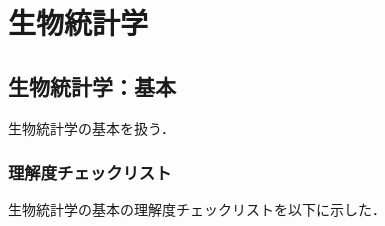 
\part{生物統計学}

\chapter{生物統計学：基本}

生物統計学の基本を扱う．

\section{理解度チェックリスト}

生物統計学の基本の理解度チェックリスト\cite{キホンのキ}を以下に示した．

